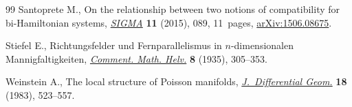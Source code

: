 \begin{thebibliography}{99}
Santoprete M., On the relationship between two notions of compatibility for
 bi-{H}amiltonian systems, \href{https://doi.org/10.3842/SIGMA.2015.089}{\textit{SIGMA}} \textbf{11} (2015), 089, 11~pages,
 \href{https://arxiv.org/abs/1506.08675}{arXiv:1506.08675}.

Stiefel E., Richtungsfelder und {F}ernparallelismus in $n$-dimensionalen
 {M}annigfaltigkeiten, \href{https://doi.org/10.1007/BF01199559}{\textit{Comment. Math. Helv.}} \textbf{8} (1935), 305--353.

Weinstein A., The local structure of {P}oisson manifolds,
 \href{https://doi.org/10.4310/jdg/1214437787}{\textit{J.~Differential Geom.}} \textbf{18} (1983), 523--557.

\end{thebibliography}
